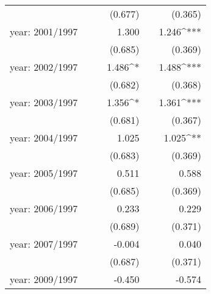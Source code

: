 \begin{tabular}{lD{.}{.}{3}D{.}{.}{3}D{.}{.}{3}D{.}{.}{3}D{.}{.}{3}}
                                                                                                &  &  & (0.677) &  & (0.365)\\
year: 2001/1997                                                                                 &  &  & 1.300 &  & 1.246^{***}\\
                                                                                                &  &  & (0.685) &  & (0.369)\\
year: 2002/1997                                                                                 &  &  & 1.486^{*} &  & 1.488^{***}\\
                                                                                                &  &  & (0.682) &  & (0.368)\\
year: 2003/1997                                                                                 &  &  & 1.356^{*} &  & 1.361^{***}\\
                                                                                                &  &  & (0.681) &  & (0.367)\\
year: 2004/1997                                                                                 &  &  & 1.025 &  & 1.025^{**}\\
                                                                                                &  &  & (0.683) &  & (0.369)\\
year: 2005/1997                                                                                 &  &  & 0.511 &  & 0.588\\
                                                                                                &  &  & (0.685) &  & (0.369)\\
year: 2006/1997                                                                                 &  &  & 0.233 &  & 0.229\\
                                                                                                &  &  & (0.689) &  & (0.371)\\
year: 2007/1997                                                                                 &  &  & -0.004 &  & 0.040\\
                                                                                                &  &  & (0.687) &  & (0.371)\\
year: 2009/1997                                                                                 &  &  & -0.450 &  & -0.574\\

\end{tabular}
